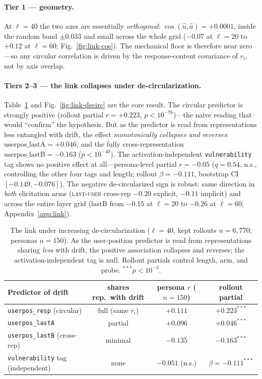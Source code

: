 \documentclass{article}
\newcommand{\lastuser}{\textsc{last-user}}
\begin{document}
\paragraph{Tier 1 --- geometry.} At $\ell{=}40$ the two axes are essentially
\emph{orthogonal}: $\cos(\hat{u},\hat{a}){=}{+}0.0001$, inside the random band
$\pm 0.033$ and small across the whole grid ($-0.07$ at $\ell{=}20$ to $+0.12$ at
$\ell{=}60$; Fig.~\ref{fig:link-cos}). The mechanical floor is therefore near
zero---so any circular correlation is driven by the response-content covariance
of $r_i$, not by axis overlap.

\paragraph{Tiers 2--3 --- the link collapses under de-circularization.}
Table~\ref{tab:link} and Fig.~\ref{fig:link-decirc} are the core result. The
circular predictor is strongly positive (rollout partial $r{=}{+}0.223$,
$p{<}10^{-76}$)---the naive reading that would ``confirm'' the hypothesis. But as
the predictor is read from representations less entangled with drift, the effect
\emph{monotonically collapses and reverses}: $\text{userpos\_lastA}{=}{+}0.046$,
and the fully cross-representation $\text{userpos\_lastB}{=}{-}0.163$
($p{<}10^{-40}$). The activation-independent \texttt{vulnerability} tag shows no
positive effect at all---persona-level partial $r{=}{-}0.05$ ($q{=}0.54$, n.s.,
controlling the other four tags and length; rollout $\beta{=}{-}0.111$,
bootstrap CI $[-0.149,-0.076]$). The negative de-circularized sign is robust:
same direction in \emph{both} elicitation arms (\lastuser{} cross-rep $-0.20$
explicit, $-0.11$ implicit) and across the entire layer grid ($\text{lastB}$
from $-0.15$ at $\ell{=}20$ to $-0.26$ at $\ell{=}60$; Appendix~\ref{app:link}).

\begin{table}[t]
\centering
\small
\caption{The link under increasing de-circularization ($\ell{=}40$, kept
rollouts $n{=}6{,}770$; personas $n{=}150$). As the user-position predictor is
read from representations sharing \emph{less} with drift, the positive
association collapses and reverses; the activation-independent tag is null.
Rollout partials control length, arm, and probe. $^{***}p<10^{-3}$.}
\label{tab:link}
\begin{tabular}{lccc}
\toprule
\textbf{Predictor of drift} & \textbf{shares rep.\ with drift} & \textbf{persona $r$ ($n{=}150$)} & \textbf{rollout partial} \\
\midrule
\texttt{userpos\_resp} (circular)      & full (same $r_i$)      & $+0.111$        & $+0.223^{***}$ \\
\texttt{userpos\_lastA}                & partial                & $+0.096$        & $+0.046^{***}$ \\
\texttt{userpos\_lastB} (cross-rep)    & minimal                & $-0.135$        & $-0.163^{***}$ \\
\texttt{vulnerability} tag (independent) & none                 & $-0.051$ (n.s.) & $\beta{=}{-}0.111^{***}$ \\
\bottomrule
\end{tabular}
\end{table}
\end{document}

